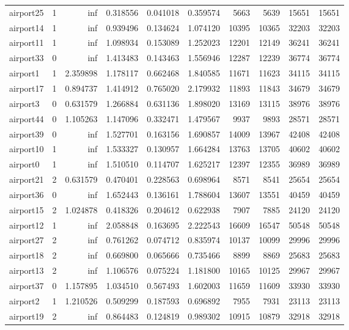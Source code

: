 \begin{longtable}{|l|r|r|r|r|r|r|r|r|r|}
airport25 & 1 & inf & 0.318556 & 0.041018 & 0.359574 & 5663 & 5639 & 15651 & 15651 \\
airport14 & 1 & inf & 0.939496 & 0.134624 & 1.074120 & 10395 & 10365 & 32203 & 32203 \\
airport11 & 1 & inf & 1.098934 & 0.153089 & 1.252023 & 12201 & 12149 & 36241 & 36241 \\
airport33 & 0 & inf & 1.413483 & 0.143463 & 1.556946 & 12287 & 12239 & 36774 & 36774 \\
airport1 & 1 & 2.359898 & 1.178117 & 0.662468 & 1.840585 & 11671 & 11623 & 34115 & 34115 \\
airport17 & 1 & 0.894737 & 1.414912 & 0.765020 & 2.179932 & 11893 & 11843 & 34679 & 34679 \\
airport3 & 0 & 0.631579 & 1.266884 & 0.631136 & 1.898020 & 13169 & 13115 & 38976 & 38976 \\
airport44 & 0 & 1.105263 & 1.147096 & 0.332471 & 1.479567 & 9937 & 9893 & 28571 & 28571 \\
airport39 & 0 & inf & 1.527701 & 0.163156 & 1.690857 & 14009 & 13967 & 42408 & 42408 \\
airport10 & 1 & inf & 1.533327 & 0.130957 & 1.664284 & 13763 & 13705 & 40602 & 40602 \\
airport0 & 1 & inf & 1.510510 & 0.114707 & 1.625217 & 12397 & 12355 & 36989 & 36989 \\
airport21 & 2 & 0.631579 & 0.470401 & 0.228563 & 0.698964 & 8571 & 8541 & 25654 & 25654 \\
airport36 & 0 & inf & 1.652443 & 0.136161 & 1.788604 & 13607 & 13551 & 40459 & 40459 \\
airport15 & 2 & 1.024878 & 0.418326 & 0.204612 & 0.622938 & 7907 & 7885 & 24120 & 24120 \\
airport12 & 1 & inf & 2.058848 & 0.163695 & 2.222543 & 16609 & 16547 & 50548 & 50548 \\
airport27 & 2 & inf & 0.761262 & 0.074712 & 0.835974 & 10137 & 10099 & 29996 & 29996 \\
airport18 & 2 & inf & 0.669800 & 0.065666 & 0.735466 & 8899 & 8869 & 25683 & 25683 \\
airport13 & 2 & inf & 1.106576 & 0.075224 & 1.181800 & 10165 & 10125 & 29967 & 29967 \\
airport37 & 0 & 1.157895 & 1.034510 & 0.567493 & 1.602003 & 11659 & 11609 & 33930 & 33930 \\
airport2 & 1 & 1.210526 & 0.509299 & 0.187593 & 0.696892 & 7955 & 7931 & 23113 & 23113 \\
airport19 & 2 & inf & 0.864483 & 0.124819 & 0.989302 & 10915 & 10879 & 32918 & 32918 \\

\end{longtable}
